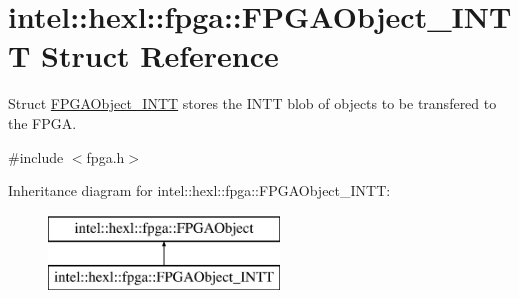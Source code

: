 \hypertarget{structintel_1_1hexl_1_1fpga_1_1FPGAObject__INTT}{\section{intel\-:\-:hexl\-:\-:fpga\-:\-:F\-P\-G\-A\-Object\-\_\-\-I\-N\-T\-T Struct Reference}
\label{structintel_1_1hexl_1_1fpga_1_1FPGAObject__INTT}
}


Struct \hyperlink{structintel_1_1hexl_1_1fpga_1_1FPGAObject__INTT}{F\-P\-G\-A\-Object\-\_\-\-I\-N\-T\-T} stores the I\-N\-T\-T blob of objects to be transfered to the F\-P\-G\-A.  




{\ttfamily \#include $<$fpga.\-h$>$}

Inheritance diagram for intel\-:\-:hexl\-:\-:fpga\-:\-:F\-P\-G\-A\-Object\-\_\-\-I\-N\-T\-T\-:\begin{figure}[H]
\begin{center}
\leavevmode
\includegraphics[height=2.000000cm]{structintel_1_1hexl_1_1fpga_1_1FPGAObject__INTT}
\end{center}
\end{figure}
